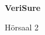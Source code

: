 \documentclass[a4paper]{article}
\begin{document}
\printGenericVSLHeader
\begin{center}
\begin{vsltext}{3cm}{4cm}

   \vspace{0.5cm} 

    \textbf{VeriSure} 

    \vspace{1.5cm}

    Hörsaal 2

\end{vsltext}

\end{center}
\end{document}
